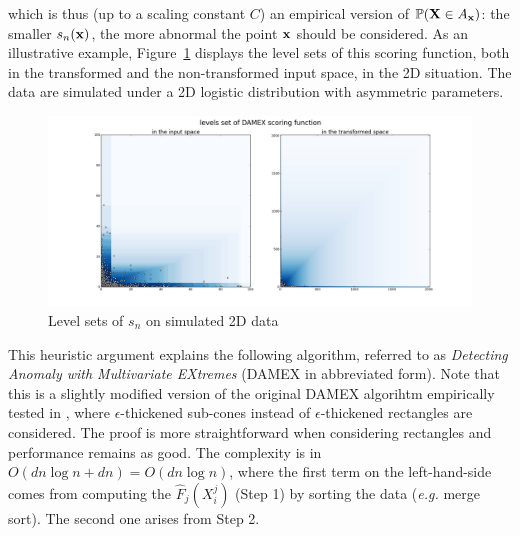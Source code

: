 which is thus (up to a scaling constant $C$) an empirical version of $\mathbb{P}(\mathbf X\in A_{\mathbf x})$: the smaller $s_n(\mathbf x)$, the more abnormal the point $\mathbf x$ should be considered.
As an illustrative example, Figure~\ref{jmva:DAMEX-2D} displays the level
sets of this scoring function, both in the transformed and the non-transformed input space, in the 2D situation. The data are simulated under a 2D logistic distribution with asymmetric parameters. 
\begin{figure}[!ht]
\centering
\includegraphics[scale=0.2331]{fig_source/plot_damex_level_sets.png}
\caption{Level sets of $s_n$ on simulated 2D data}
\label{jmva:DAMEX-2D}
\end{figure}

 This heuristic argument explains the following algorithm, referred to as {\it Detecting Anomaly with Multivariate EXtremes}  (DAMEX in abbreviated form). Note that this is a slightly modified version of the original DAMEX algorihtm empirically tested in \cite{AISTAT16}, where $\epsilon$-thickened sub-cones instead of $\epsilon$-thickened rectangles are considered. The proof is more straightforward when considering rectangles and performance remains as good.
The complexity is in $O( dn\log n + dn) = O(dn\log n)$, where the first term on the left-hand-side comes from  computing the $\widehat F_j(X_i^j)$ (Step 1) by sorting  the data (\emph{e.g.} merge sort). The second one arises from Step 2. 

